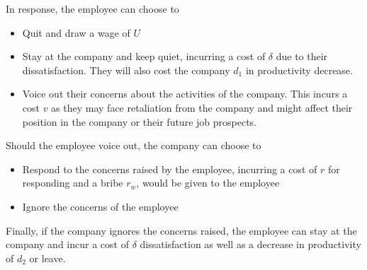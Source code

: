 \documentclass[a4paper, 12pt]{article}
\begin{document}
In response, the employee can choose to
\begin{itemize}[noitemsep]
    \item Quit and draw a wage of $U$
    \item Stay at the company and keep quiet, incurring a cost of $\delta$ due to their dissatisfaction. They will also cost the company $d_1$ in productivity decrease.
    \item Voice out their concerns about the activities of the company. This incurs a cost $v$ as they may face retaliation from the company and might affect their position in the company or their future job prospects.
\end{itemize}

Should the employee voice out, the company can choose to
\begin{itemize}[noitemsep]
    \item Respond to the concerns raised by the employee, incurring a cost of $r$ for responding and a bribe $r_w$, would be given to the employee
    \item Ignore the concerns of the employee
\end{itemize}

Finally, if the company ignores the concerns raised, the employee can stay at the company and incur a cost of $\delta$ dissatisfaction as well as a decrease in productivity of $d_2$ or leave.
\end{document}
